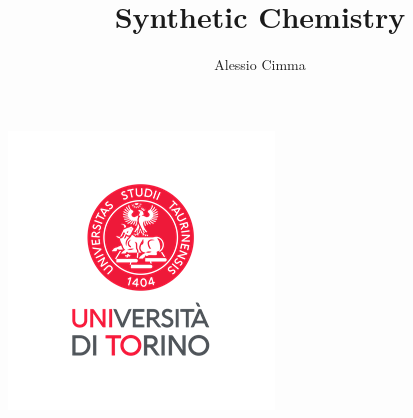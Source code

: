 \documentclass{article}
\title{Synthetic Chemistry}
\author{Alessio Cimma}
\begin{document}
\maketitle

\begin{center}
	\includegraphics*[width=0.22\linewidth]{../images/logo.png}
\end{center}

\tableofcontents
\newpage















\end{document}
